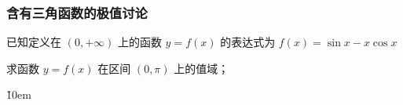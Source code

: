 \subsubsection{含有三角函数的极值讨论}

\begin{example}
    已知定义在 $(0,+\infty)$ 上的函数 $y=f(x)$ 的表达式为 $f(x)=\sin x-x \cos x$

    求函数 $y=f(x)$ 在区间 $(0, \pi)$ 上的值域；
\end{example}

\v{10em}
